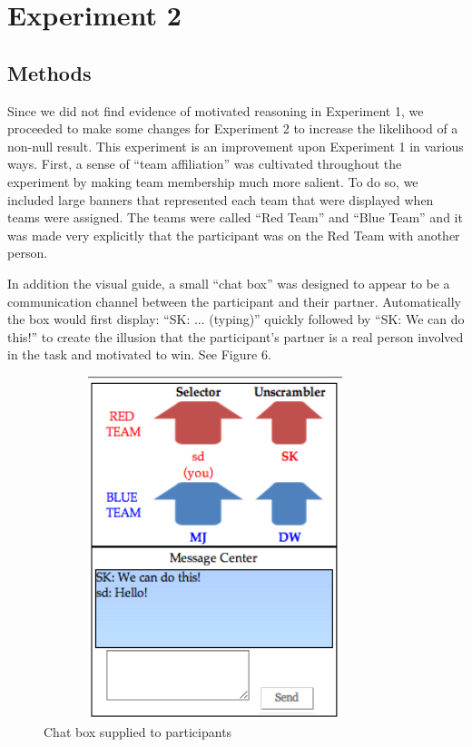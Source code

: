 \documentclass{article}
\begin{document}
\section{Experiment 2}

\subsection{Methods}
Since we did not find evidence of motivated reasoning in Experiment 1, we proceeded to make some changes for Experiment 2 to increase the likelihood of a non-null result. This experiment is an improvement upon Experiment 1 in various ways. First, a sense of ``team affiliation'' was cultivated throughout the experiment by making team membership much more salient. To do so, we included large banners that represented each team that were displayed when teams were assigned. The teams were called ``Red Team'' and ``Blue Team'' and it was made very explicitly that the participant was on the Red Team with another person. 

In addition the visual guide, a small ``chat box'' was designed to appear to be a communication channel between the participant and their partner. Automatically the box would first display: ``SK: ... (typing)'' quickly followed by ``SK: We can do this!'' to create the illusion that the participant's partner is a real person involved in the task and motivated to win. See Figure 6.

\begin{figure}
\centering
    \includegraphics[width=10cm,height=10cm,keepaspectratio]{team_picture}
    \caption{Chat box supplied to participants}
      \label{fig:team_picture}
\end{figure}
\end{document}
